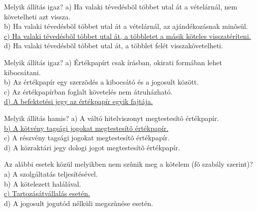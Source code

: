 \begin{frame}

\begin{tcolorbox}[title={137. Kérdés}]
Melyik állítás igaz?
\tcblower
a) Ha valaki tévedésbõl többet utal át a vételárnál, nem követelheti azt vissza.\\
b) Ha valaki tévedésbõl többet utal át a vételárnál, az ajándékozásnak minõsül.\\
\uline {c) Ha valaki tévedésbõl többet utal át, a többletet a másik köteles visszatéríteni.}\\
d) Ha valaki tévedésbõl többet utal át, a többlet felét visszakövetelheti.
\end{tcolorbox}

\begin{tcolorbox}[title={138. Kérdés}]
Melyik állítás igaz?
\tcblower
a) Értékpapírt csak írásban, okirati formában lehet kibocsátani.\\
b) Az értékpapír egy szerzõdés a kibocsátó és a jogosult között.\\
c) Az értékpapírban foglalt követelés nem átruházható.\\
\uline {d) A befektetési jegy az értékpapír egyik fajtája.}
\end{tcolorbox}

\begin{tcolorbox}[title={139. Kérdés}]
Melyik állítás hamis?
\tcblower
a) A váltó hitelviszonyt megtestesítõ értékpapír.\\
\uline {b) A kötvény tagsági jogokat megtestesítõ értékpapír.}\\
c) A részvény tagsági jogokat megtestesítõ értékpapír.\\
d) A közraktári jegy dologi jogot megtestesítõ értékpapír.
\end{tcolorbox}

\begin{tcolorbox}[title={140. Kérdés}]
Az alábbi esetek közül melyikben nem szûnik meg a kötelem (fõ szabály szerint)?
\tcblower
a) A szolgáltatás teljesítésével.\\
b) A kötelezett halálával.\\
\uline {c) Tartozásátvállalás esetén.}\\
d) A jogosult jogutód nélküli megszûnése esetén.
\end{tcolorbox}

\end{frame}


